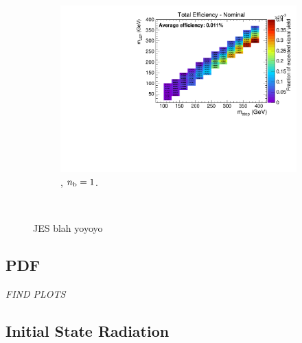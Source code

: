 \begin{figure}[ht!]
\begin{subfigure}[b]{0.32\textwidth}
    \includegraphics[width=\textwidth, page=6]{Figs/sms/t2degen/v5/JES_T2_4body_v5_eq1b_ge4j_incl.pdf}
    \caption{\njhigh, $n_{\text{b}} = 1$.}
  \end{subfigure}\\
  \caption{JES blah yoyoyo}
  \label{fig:sms-jes-t2degen}
\end{figure}


\newpage
\subsection*{PDF}
\label{sec:t2degen_pdf_plots}
\emph{FIND PLOTS}



\newpage
\subsection*{Initial State Radiation}
\label{sec:t2degen_isr_plots}

